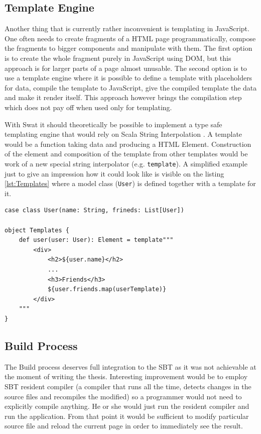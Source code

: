 \documentclass[12pt,a4paper]{report}
\begin{document}
\subsection{Template Engine}

Another thing that is currently rather inconvenient is templating in JavaScript. One often needs to create fragments of a HTML page programmatically, compose the fragments to bigger components and manipulate with them. The first option is to create the whole fragment purely in JavaScript using DOM, but this approach is for larger parts of a page almost unusable. The second option is to use a template engine where it is possible to define a template with placeholders for data, compile the template to JavaScript, give the compiled template the data and make it render itself. This approach however brings the compilation step which does not pay off when used only for templating.

With Swat it should theoretically be possible to implement a type safe templating engine that would rely on Scala String Interpolation \cite{StringInterpolation}. A template would be a function taking data and producing a HTML Element. Construction of the element and composition of the template from other templates would be work of a new special string interpolator (e.g. \texttt{template}). A simplified example just to give an impression how it could look like is visible on the listing \ref{lst:Templates} where a model class (\texttt{User}) is defined together with a template for it.

\begin{minipage}{\linewidth}
\begin{lstlisting}[caption={Templating engine example.},label={lst:Templates}]
case class User(name: String, frineds: List[User])

object Templates {
    def user(user: User): Element = template"""
        <div>
            <h2>${user.name}</h2>
            ...
            <h3>Friends</h3>
            ${user.friends.map(userTemplate)}
        </div>
    """
}
\end{lstlisting}
\end{minipage}

\subsection{Build Process}

The Build process deserves full integration to the SBT as it was not achievable at the moment of writing the thesis. Interesting improvement would be to employ SBT resident compiler (a compiler that runs all the time, detects changes in the source files and recompiles the modified) so a programmer would not need to explicitly compile anything. He or she would just run the resident compiler and run the application. From that point it would be sufficient to modify particular source file and reload the current page in order to immediately see the result.
\end{document}
